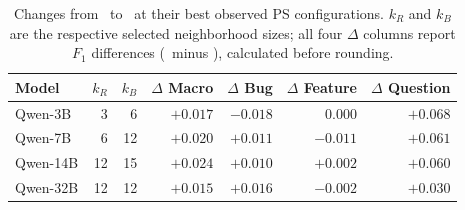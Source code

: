 \begin{table}[t]
  \centering\color{coauthorcolor}
  \caption{Changes from \ragtag\ to \bragtag\ at their best observed PS configurations. $k_R$ and $k_B$ are the respective selected neighborhood sizes; all four $\Delta$ columns report $F_1$ differences (\bragtag\ minus \ragtag), calculated before rounding.}
  \label{tab:bragtag-results}
  \footnotesize
  \setlength{\tabcolsep}{3pt}
  \begin{tabular}{lrrrrrr}
    \toprule
    Model & $k_R$ & $k_B$ & $\Delta$ Macro & $\Delta$ Bug & $\Delta$ Feature & $\Delta$ Question \\
    \midrule
    Qwen-3B  & 3  & 6  & $+0.017$ & $-0.018$ & $0.000$  & $+0.068$ \\
    Qwen-7B  & 6  & 12 & $+0.020$ & $+0.011$ & $-0.011$ & $+0.061$ \\
    Qwen-14B & 12 & 15 & $+0.024$ & $+0.010$ & $+0.002$ & $+0.060$ \\
    Qwen-32B & 12 & 12 & $+0.015$ & $+0.016$ & $-0.002$ & $+0.030$ \\
    \bottomrule
  \end{tabular}
\end{table}
